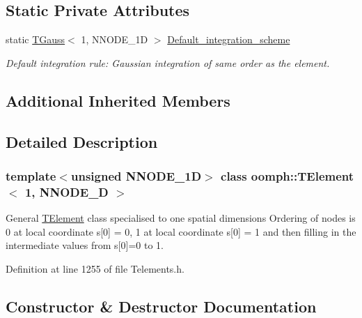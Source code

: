\subsection*{Static Private Attributes}
\begin{DoxyCompactItemize}
\item 
static \hyperlink{classoomph_1_1TGauss}{T\+Gauss}$<$ 1, N\+N\+O\+D\+E\+\_\+1D $>$ \hyperlink{classoomph_1_1TElement_3_011_00_01NNODE__1D_01_4_ac17af50be3265871c7a24d20a4165fc0}{Default\+\_\+integration\+\_\+scheme}
\begin{DoxyCompactList}\small\item\em Default integration rule\+: Gaussian integration of same \textquotesingle{}order\textquotesingle{} as the element. \end{DoxyCompactList}\end{DoxyCompactItemize}
\subsection*{Additional Inherited Members}


\subsection{Detailed Description}
\subsubsection*{template$<$unsigned N\+N\+O\+D\+E\+\_\+1D$>$\newline
class oomph\+::\+T\+Element$<$ 1, N\+N\+O\+D\+E\+\_\+D $>$}

General \hyperlink{classoomph_1_1TElement}{T\+Element} class specialised to one spatial dimensions Ordering of nodes is 0 at local coordinate s\mbox{[}0\mbox{]} = 0, 1 at local coordinate s\mbox{[}0\mbox{]} = 1 and then filling in the intermediate values from s\mbox{[}0\mbox{]}=0 to 1. 

Definition at line 1255 of file Telements.\+h.



\subsection{Constructor \& Destructor Documentation}
\mbox{\label{classoomph_1_1TElement_3_011_00_01NNODE__1D_01_4_a4f2cbb79c20b6540c1a55e49106f2b0a}} 
